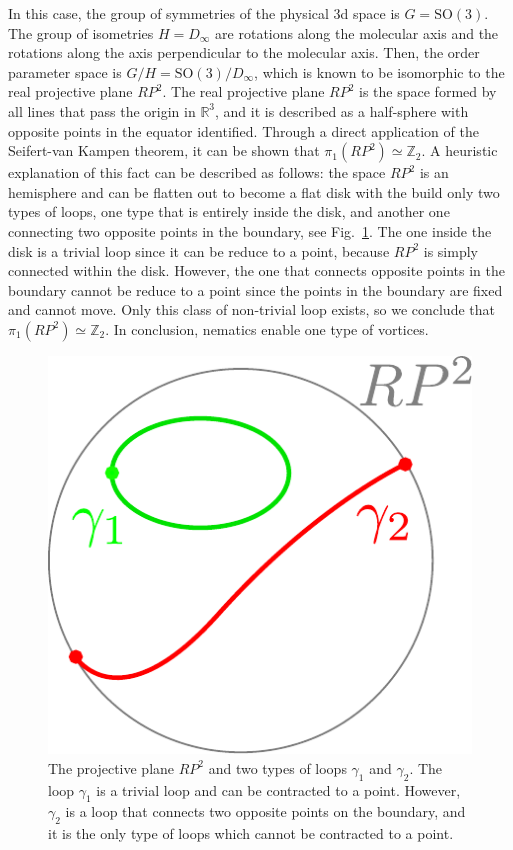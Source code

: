 In this case, the group of symmetries of the physical 3d space is $G=\text{SO}(3)$. The group of isometries $H=D_{\infty}$ are rotations along the molecular axis and the rotations along the axis perpendicular to the molecular axis. Then, the order parameter space is $G/H = \text{SO}(3)/D_{\infty}$, which is known to be isomorphic to the real projective plane $RP^2$. The real projective plane $RP^2$ is the space formed by all lines that pass the origin in $\mathbb{R}^3$, and it is described as a half-sphere with opposite points in the equator identified. Through a direct application of the Seifert-van Kampen theorem, it can be shown that $\pi_1(RP^2) \simeq \mathbb{Z}_2$. A heuristic explanation of this fact can be described as follows: the space $RP^2$ is an hemisphere and can be flatten out to become a flat disk with the build only two types of loops, one type that is entirely inside the disk, and another one connecting two opposite points in the boundary, see Fig.\ \ref{fig:rp2}. The one inside the disk is a trivial loop since it can be reduce to a point, because $RP^2$ is simply connected within the disk. However, the one that connects opposite points in the boundary cannot be reduce to a point since the points in the boundary are fixed and cannot move. Only this class of non-trivial loop exists, so we conclude that $\pi_1(RP^2)\simeq \mathbb{Z}_2$. In conclusion, nematics enable one type of vortices. 

\begin{figure}
\centering
	\includegraphics[scale=0.7]{./figures/rp2.pdf}
	\caption{The projective plane $RP^2$ and two types of loops $\gamma_1$ and $\gamma_2$. The loop $\gamma_1$ is a trivial loop and can be contracted to a point. However, $\gamma_2$ is a loop that connects two opposite points on the boundary, and it is the only type of loops which cannot be contracted to a point.}
	\label{fig:rp2}
\end{figure}

